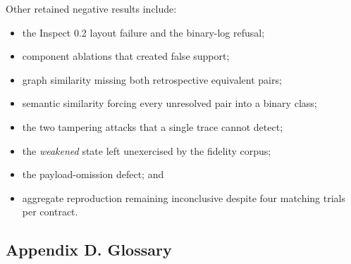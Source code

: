 \documentclass[
  american,
  10pt,
  a4paper,
]{article}
\providecommand{\tightlist}{%
  \setlength{\itemsep}{0pt}\setlength{\parskip}{0pt}}
\begin{document}
Other retained negative results include:

\begin{itemize}
\tightlist
\item
  the Inspect 0.2 layout failure and the binary-log refusal;
\item
  component ablations that created false support;
\item
  graph similarity missing both retrospective equivalent pairs;
\item
  semantic similarity forcing every unresolved pair into a binary class;
\item
  the two tampering attacks that a single trace cannot detect;
\item
  the \emph{weakened} state left unexercised by the fidelity corpus;
\item
  the payload-omission defect; and
\item
  aggregate reproduction remaining inconclusive despite four matching
  trials per contract.
\end{itemize}

\subsection{Appendix D. Glossary}\label{appendix-d.-glossary}
\end{document}
